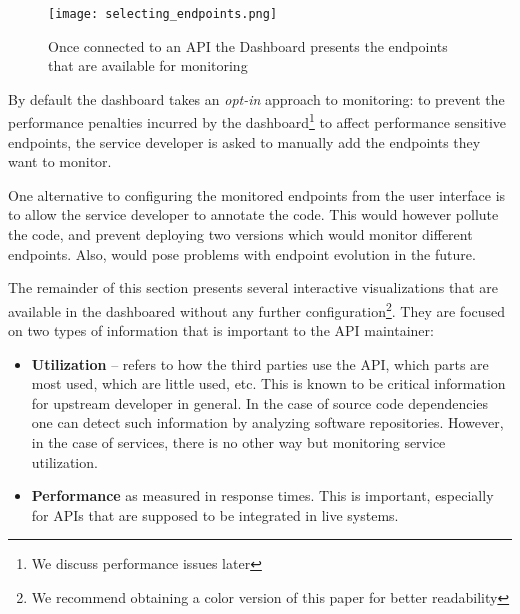   


    \begin{figure}[h!]
      \centering
      \texttt{[image: selecting\_endpoints.png]}
      \caption{Once connected to an API the Dashboard presents the endpoints that are available for monitoring}
      \label{fig:sep}
    \end{figure}

  By default the dashboard takes an {\em opt-in} approach to monitoring: to prevent the performance penalties incurred by the dashboard\footnote{We discuss performance issues later} to affect performance sensitive endpoints, the service developer is asked to manually add the endpoints they want to monitor. 
   

  One alternative to configuring the monitored endpoints from the user interface is to allow the service developer to annotate the code. This would however pollute the code, and prevent deploying two versions which would monitor different endpoints. Also, would pose problems with endpoint evolution in the future.

  
\niceseparator

  The remainder of this section presents several interactive
  visualizations that are available in the dashboared without any further configuration\footnote{We recommend obtaining a color version of this paper for better readability}. They are focused on two types of information that is important to the API maintainer: 

  \begin{itemize}

    \item {\bf Utilization} -- refers to how the third parties use the API, which parts are most used, which are little used, etc. This is known to be critical information for upstream developer in general\cite{Haen14a}. In the case of source code dependencies one can detect such information by analyzing software repositories. However, in the case of services, there is no other way but monitoring service utilization. 

    \item {\bf Performance} as measured in response times. This is important, especially for APIs that are supposed to be integrated in live systems. 

  \end{itemize}
